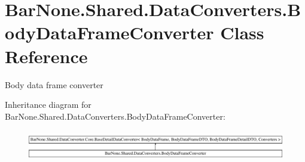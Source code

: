 \hypertarget{class_bar_none_1_1_shared_1_1_data_converters_1_1_body_data_frame_converter}{}\section{Bar\+None.\+Shared.\+Data\+Converters.\+Body\+Data\+Frame\+Converter Class Reference}
\label{class_bar_none_1_1_shared_1_1_data_converters_1_1_body_data_frame_converter}


Body data frame converter  


Inheritance diagram for Bar\+None.\+Shared.\+Data\+Converters.\+Body\+Data\+Frame\+Converter\+:\begin{figure}[H]
\begin{center}
\leavevmode
\includegraphics[height=1.314554cm]{class_bar_none_1_1_shared_1_1_data_converters_1_1_body_data_frame_converter}
\end{center}
\end{figure}
